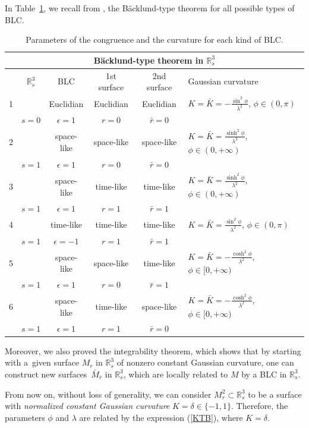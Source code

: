 \documentclass[pdftex]{sigma}
\numberwithin{equation}{section}
\begin{document}
In Table~\ref{table1}, we recall from \cite{KRT2022}, the B\"acklund-type theorem for all possible types of BLC.
\begin{table}[th]\renewcommand{\arraystretch}{1.33}
\centering
\begin{tabular}{|l|c|c|c|c|l|}
\hline
\multicolumn{6}{|c|}{\textbf{B\"acklund-type theorem in ${\mathbb{R}}^3_s$}}\\
\hline
 & ${\mathbb{R}}^3_s$ & BLC & 1st surface & 2nd surface & Gaussian curvature\\
\hline
1 & & Euclidian & Euclidian &Euclidian & $K=\bar{K}=-\frac{\sin^2{\phi}}{\lambda^2}$, $\phi\in(0,\pi)$ \\
 &$ s=0$ & $\epsilon=1$ & $r=0$ & $\bar{r}=0$& \\
\hline
2 & &space-like & space-like & space-like & $K=\bar{K}=\frac{\sinh^2{\phi}}{\lambda^2}$, $\phi\in(0,+\infty)$ \\
& $s=1$ &$\epsilon=1$& $r=0$ & $\bar{r}=0$&
\\
\hline
3& & space-like&time-like&time-like&$K=\bar{K}=\frac{\sinh^2{\phi}}{\lambda^2}$, $\phi\in(0,+\infty)$
\\
& $s=1$ &$\epsilon=1$& $r=1$ & $\bar{r}=1$& \\
\hline
4& & time-like&time-like&time-like &$K=\bar{K}=\frac{\sin^2{\phi}}{\lambda^2}$, $\phi\in(0,\pi)$ \\
& $s=1$ &$\epsilon=-1$& $r=1$ & $\bar{r}=1$& \\
\hline
5& &space-like&space-like&time-like&$K=\bar{K}=-\frac{\cosh^2{\phi}}{\lambda^2}$, $\phi\in[0,+\infty)$ \\
& $s=1$ &$\epsilon=1$& $r=0$ & $\bar{r}=1$& \\
\hline
6& &space-like&time-like&space-like&$K=\bar{K}=-\frac{\cosh^2{\phi}}{\lambda^2}$, $\phi\in[0,+\infty)$ \\
& $s=1$ &$\epsilon=1$& $r=1$ & $\bar{r}=0$& \\
\hline
\end{tabular}
\caption{Parameters of the congruence and the curvature for each kind of BLC.}\label{table1}
\end{table}

Moreover, we also proved the integrability theorem, which shows that by starting with a~given surface $M_r$ in ${\mathbb{R}}^3_s$ of nonzero constant Gaussian curvature, one can construct new surfaces~$\bar{M}_{\bar{r}}$ in ${\mathbb{R}}^3_s$, which are locally related to $M$ by a BLC in ${\mathbb{R}}^3_s$.

 From now on, without loss of generality, we can consider $M^2_r\subset{\mathbb{R}}^3_s$ to be a surface with {\it normalized constant Gaussian curvature} $K=\delta\in\{ -1,1\}$. Therefore, the parameters $\phi$ and $\lambda$ are related by the expression (\ref{KTB}), where $K=\delta$.
\end{document}
